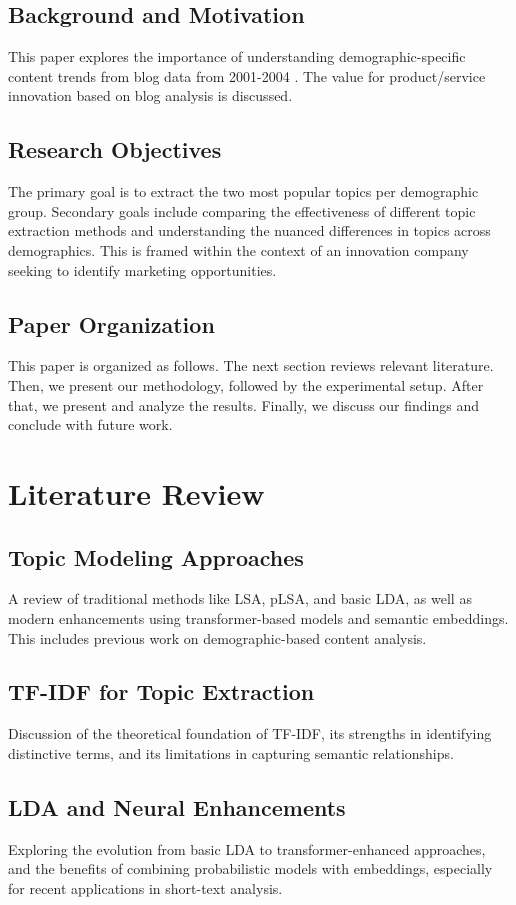 \documentclass[conference]{IEEEtran}
\begin{document}
\subsection{Background and Motivation}
This paper explores the importance of understanding demographic-specific content trends from blog data from 2001-2004 \cite{schler2006effects}.
The value for product/service innovation based on blog analysis is discussed.

\subsection{Research Objectives}
The primary goal is to extract the two most popular topics per demographic group. Secondary goals include comparing the effectiveness of different topic extraction methods and understanding the nuanced differences in topics across demographics. This is framed within the context of an innovation company seeking to identify marketing opportunities.

\subsection{Paper Organization}
This paper is organized as follows. The next section reviews relevant literature. Then, we present our methodology, followed by the experimental setup. After that, we present and analyze the results. Finally, we discuss our findings and conclude with future work.

\section{Literature Review}
\subsection{Topic Modeling Approaches}
A review of traditional methods like LSA, pLSA, and basic LDA, as well as modern enhancements using transformer-based models and semantic embeddings. This includes previous work on demographic-based content analysis.

\subsection{TF-IDF for Topic Extraction}
Discussion of the theoretical foundation of TF-IDF, its strengths in identifying distinctive terms, and its limitations in capturing semantic relationships.

\subsection{LDA and Neural Enhancements}
Exploring the evolution from basic LDA to transformer-enhanced approaches, and the benefits of combining probabilistic models with embeddings, especially for recent applications in short-text analysis.
\end{document}
